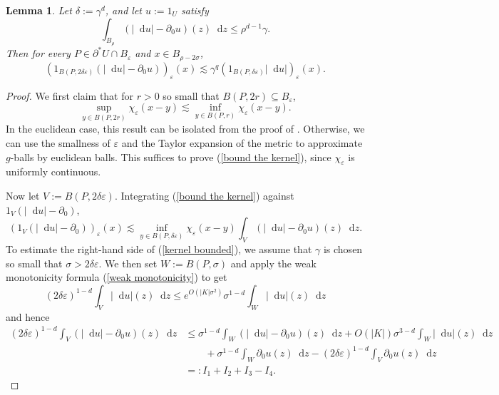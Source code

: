 \documentclass[final,12pt, leqno]{brownthesis}
\newcommand*\dif{\mathop{}\!\mathrm{d}}
\newtheorem{lemma}[theorem]{Lemma}
\theoremstyle{definition}
\numberwithin{equation}{section}
\begin{document}
\begin{lemma}\label{mollifier sublemma}
Let $\delta := \gamma^d$, and let $u := 1_U$ satisfy
\begin{equation}\label{hypothesis on mollifier sublemma}
\int_{B_\rho} (|\dif u| - \partial_0 u)(z) \dif z \leq \rho^{d - 1} \gamma.
\end{equation}
Then for every $P \in \partial^* U \cap B_\varepsilon$ and $x \in B_{\rho - 2\sigma}$,
$$(1_{B(P, 2\delta\varepsilon)}(|\dif u| - \partial_0 u))_\varepsilon(x) \lesssim \gamma^q (1_{B(P, \delta\varepsilon)} |\dif u|)_\varepsilon(x).$$
\end{lemma}
\begin{proof}
We first claim that for $r > 0$ so small that $B(P, 2r) \subseteq B_\varepsilon$,
\begin{equation}\label{bound the kernel}
\sup_{y \in B(P, 2r)} \chi_\varepsilon(x - y) \lesssim \inf_{y \in B(P, r)} \chi_\varepsilon(x - y).
\end{equation}
In the euclidean case, this result can be isolated from the proof of \cite[Theorem 7.3]{Giusti77}.
Otherwise, we can use the smallness of $\varepsilon$ and the Taylor expansion of the metric to approximate $g$-balls by euclidean balls.
This suffices to prove (\ref{bound the kernel}), since $\chi_\varepsilon$ is uniformly continuous.

Now let $V := B(P, 2\delta\varepsilon)$.
Integrating (\ref{bound the kernel}) against $1_V(|\dif u| - \partial_0)$,
\begin{equation}\label{kernel bounded}
    (1_V(|\dif u| - \partial_0))_\varepsilon(x) \lesssim \inf_{y \in B(P, \delta\varepsilon)} \chi_\varepsilon(x - y) \int_V (|\dif u| - \partial_0 u)(z) \dif z.
\end{equation}
To estimate the right-hand side of (\ref{kernel bounded}), we assume that $\gamma$ is chosen so small that $\sigma > 2\delta\varepsilon$.
We then set $W := B(P, \sigma)$ and apply the weak monotonicity formula (\ref{weak monotonicity}) to get
$$(2\delta\varepsilon)^{1 - d} \int_V |\dif u|(z) \dif z \leq e^{O(|K| \sigma^2)} \sigma^{1 - d} \int_W |\dif u|(z) \dif z$$
and hence
\begin{align*}
(2\delta\varepsilon)^{1 - d} \int_V (|\dif u| - \partial_0 u)(z) \dif z
&\leq \sigma^{1 - d} \int_W (|\dif u| - \partial_0 u)(z) \dif z + O(|K|) \sigma^{3 - d} \int_W |\dif u|(z) \dif z \\
&\qquad + \sigma^{1 - d} \int_W \partial_0 u(z) \dif z - (2\delta\varepsilon)^{1 - d} \int_V \partial_0 u(z) \dif z\\
&=: I_1 + I_2 + I_3 - I_4.
\end{align*}


\end{proof}
\end{document}
